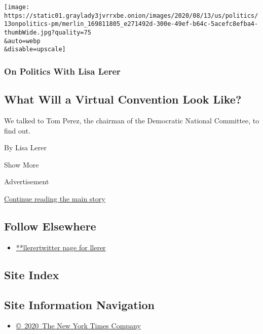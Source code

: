 \begin{enumerate}
  \texttt{[image: https://static01.graylady3jvrrxbe.onion/images/2020/08/13/us/politics/13onpolitics-pm/merlin\_169811805\_e271492d-300e-49ef-b64c-5acefc8efba4-thumbWide.jpg?quality=75\\\&auto=webp\\\&disable=upscale]}

  \hypertarget{on-politics-with-lisa-lerer-1}{%
  \subsubsection{On Politics With Lisa
  Lerer}\label{on-politics-with-lisa-lerer-1}}

  \hypertarget{what-will-a-virtual-convention-look-like}{%
  \subsection{What Will a Virtual Convention Look
  Like?}\label{what-will-a-virtual-convention-look-like}}

  We talked to Tom Perez, the chairman of the Democratic National
  Committee, to find out.

  By Lisa Lerer
\end{enumerate}

Show More

Advertisement

\protect\hyperlink{after-mid2}{Continue reading the main story}

\hypertarget{follow-elsewhere}{%
\subsection{Follow Elsewhere}\label{follow-elsewhere}}

\begin{itemize}
\tightlist
\item
  \href{https://twitter.com/llerer}{**llerertwitter page for llerer}
\end{itemize}

\hypertarget{site-index}{%
\subsection{Site Index}\label{site-index}}

\hypertarget{site-information-navigation}{%
\subsection{Site Information
Navigation}\label{site-information-navigation}}

\begin{itemize}
\tightlist
\item
  \href{https://help.nytimes3xbfgragh.onion/hc/en-us/articles/115014792127-Copyright-notice}{©~2020~The
  New York Times Company}
\end{itemize}

